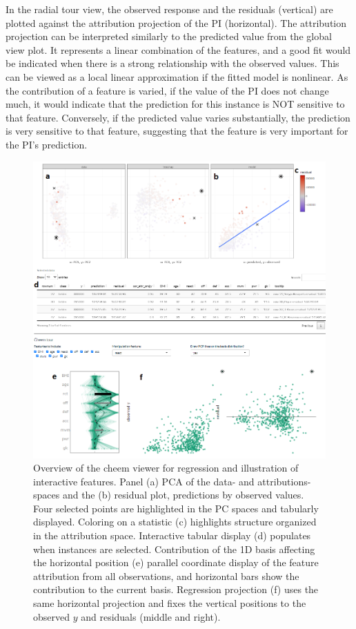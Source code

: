 \documentclass[11pt,twoside]{article}
\begin{document}
In the radial tour view, the observed response and the residuals (vertical) are plotted against the attribution projection of the PI (horizontal). The attribution projection can be interpreted similarly to the predicted value from the global view plot. It represents a linear combination of the features, and a good fit would be indicated when there is a strong relationship with the observed values. This can be viewed as a local linear approximation if the fitted model is nonlinear. As the contribution of a feature is varied, if the value of the PI does not change much, it would indicate that the prediction for this instance is NOT sensitive to that feature. Conversely, if the predicted value varies substantially, the prediction is very sensitive to that feature, suggesting that the feature is very important for the PI's prediction.

\begin{figure}

{\centering \includegraphics[width=1\linewidth]{./figures/app_regression_interactions} 

}

\caption{Overview of the cheem viewer for regression  and illustration of interactive features. Panel (a) PCA of the data- and attributions- spaces and the (b) residual plot, predictions by observed values. Four selected points are highlighted in the PC spaces and tabularly displayed. Coloring on a statistic (c) highlights structure organized in the attribution space. Interactive tabular display (d) populates when instances are selected. Contribution of the 1D basis affecting the horizontal position (e) parallel coordinate display of the feature attribution from all observations, and horizontal bars show the contribution to the current basis. Regression projection (f) uses the same horizontal projection and fixes the vertical positions to the observed $y$ and residuals (middle and right).}\label{fig:regressioncase}
\end{figure}
\end{document}
